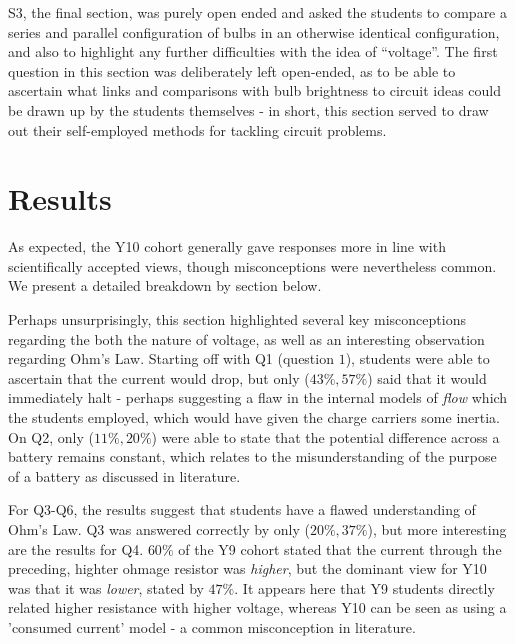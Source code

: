 \documentclass[a4paper,openany,nobib]{tufte-book}
\begin{document}
S3, the final section, was purely open ended and asked the students to compare a series and parallel configuration of bulbs in an otherwise identical configuration, and also to highlight any further difficulties with the idea of ``voltage''.
The first question in this section was deliberately left open-ended, as to be able to ascertain what links and comparisons with bulb brightness to circuit ideas could be drawn up by the students themselves - in short, this section served to draw out their self-employed methods for tackling circuit problems.
\chapter{Results}
As expected, the Y10 cohort generally gave responses more in line with scientifically accepted views, though misconceptions were nevertheless common. We present a detailed breakdown by section below.

Perhaps unsurprisingly, this section highlighted several key misconceptions regarding the both the nature of voltage, as well as an interesting observation regarding Ohm's Law. 
Starting off with Q1 (question $1$), students were able to ascertain that the current would drop,
but only ($43\%,57\%$) said that it would immediately halt - perhaps suggesting a flaw in the internal models of \emph{flow} which the students employed, which would have given the charge carriers some inertia. 
On Q2, only ($11\%, 20\%$) were able to state that the potential difference across a battery remains constant, which relates to the misunderstanding of the purpose of a battery as discussed in {literature\autocite{shipstone_children}}. 

For Q3-Q6, the results suggest that students have a flawed understanding of Ohm's Law. Q3 was answered correctly by only ($20\%,37\%$), but more interesting are the results for Q4. $60\%$ of the Y9 cohort stated that the current through the preceding, highter ohmage resistor was \emph{higher}, but the dominant view for Y10 was that it was \emph{lower}, stated by $47\%$. It appears here that Y9 students directly related higher resistance with higher voltage, whereas Y10 can be seen as using a 'consumed current' model - a common misconception in literature.
\end{document}
